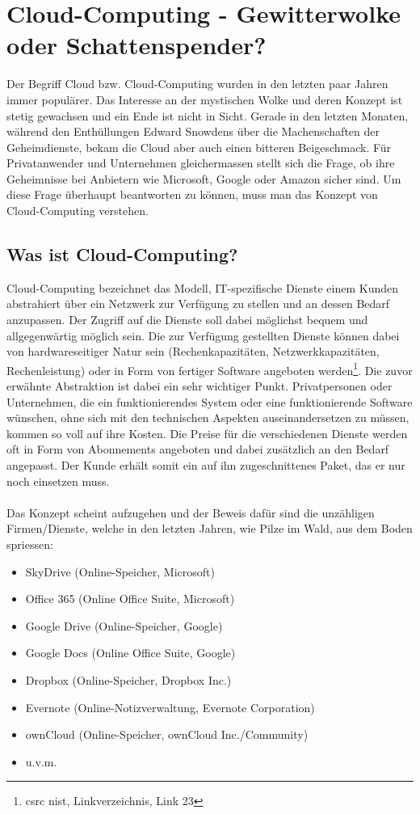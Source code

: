\section{Cloud-Computing - Gewitterwolke oder Schattenspender?}
Der Begriff Cloud bzw. Cloud-Computing wurden in den letzten paar Jahren immer populärer. Das Interesse an der mystischen Wolke und deren Konzept ist stetig gewachsen und ein Ende ist nicht in Sicht. Gerade in den letzten Monaten, während den Enthüllungen Edward Snowdens über die Machenschaften der Geheimdienste, bekam die Cloud aber auch einen bitteren Beigeschmack. Für Privatanwender und Unternehmen gleichermassen stellt sich die Frage, ob ihre Geheimnisse bei Anbietern wie Microsoft, Google oder Amazon sicher sind. Um diese Frage überhaupt beantworten zu können, muss man das Konzept von Cloud-Computing verstehen.

\subsection{Was ist Cloud-Computing?}
Cloud-Computing bezeichnet das Modell, IT-spezifische Dienste einem Kunden abstrahiert über ein Netzwerk zur Verfügung zu stellen und an dessen Bedarf anzupassen. Der Zugriff auf die Dienste soll dabei möglichst bequem und allgegenwärtig möglich sein. Die zur Verfügung gestellten Dienste können dabei von hardwareseitiger Natur sein (Rechenkapazitäten, Netzwerkkapazitäten, Rechenleistung) oder in Form von fertiger Software angeboten werden\footnote{csrc nist, Linkverzeichnis, Link 23}.
Die zuvor erwähnte Abstraktion ist dabei ein sehr wichtiger Punkt. Privatpersonen oder Unternehmen, die ein funktionierendes System oder eine funktionierende Software wünschen, ohne sich mit den technischen Aspekten auseinandersetzen zu müssen, kommen so voll auf ihre Kosten. Die Preise für die verschiedenen Dienste werden oft in Form von Abonnements angeboten und dabei zusätzlich an den Bedarf angepasst. Der Kunde erhält somit ein auf ihn zugeschnittenes Paket, das er nur noch einsetzen muss.
\\
\\
Das Konzept scheint aufzugehen und der Beweis dafür sind die unzähligen Firmen/Dienste, welche in den letzten Jahren, wie Pilze im Wald, aus dem Boden spriessen:
\begin{itemize}
\item SkyDrive (Online-Speicher, Microsoft)
\item Office 365 (Online Office Suite, Microsoft)
\item Google Drive (Online-Speicher, Google)
\item Google Docs (Online Office Suite, Google)
\item Dropbox (Online-Speicher, Dropbox Inc.)
\item Evernote (Online-Notizverwaltung, Evernote Corporation)
\item ownCloud (Online-Speicher, ownCloud Inc./Community)
\item u.v.m.
\end{itemize}

